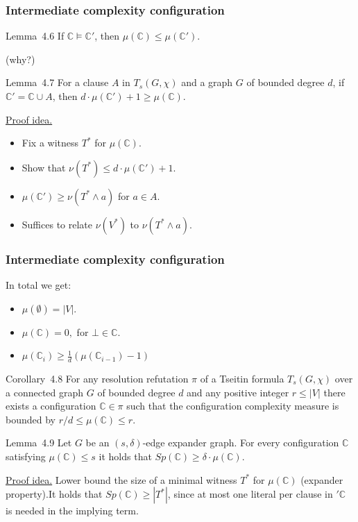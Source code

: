 \documentclass[t,usenames,dvipsnames]{beamer}
\begin{document}
\begin{frame}\frametitle{Intermediate complexity configuration}
	\begin{block} {Lemma~4.6}
		If $\mathbb{C} \models \mathbb{C}'$, then $\mu(\mathbb{C}) \leq \mu(\mathbb{C}')$.
	\end{block}
	(why?)\pause
	\begin{block} {Lemma~4.7}
		For a clause $A$ in $T_s(G, \chi)$ and a graph $G$ of bounded degree $d$, if
		$\mathbb{C'} = \mathbb{C} \cup A$, then $d \cdot \mu(\mathbb{C}') + 1 \geq
		\mu(\mathbb{C})$.
	\end{block}\pause
	\noindent \underline{Proof idea.} 
	\begin{itemize}
		\item Fix a witness $T^*$ for $\mu(\mathbb{C})$.
		\item Show that $\nu(T^*) \leq d\cdot \mu(\mathbb{C}') + 1$. 
		\item $\mu(\mathbb{C}') \geq \nu(T^* \land a)$ for $a \in A$.
		\item Suffices to relate $\nu(V^*)$ to $\nu(T^* \land a)$.
	\end{itemize}
\end{frame}\frametitle{Intermediate complexity configuration}

\begin{frame}
	In total we get:
	\begin{itemize}[<+->]
		\item $\mu(\emptyset) = |V|$.
		\item $\mu(\mathbb{C}) = 0,$ for $\bot \in \mathbb{C}$.
		\item $\mu(\mathbb{C}_i) \geq  \frac{1}{d} (\mu(\mathbb{C}_{i-1}) - 1)$
	\end{itemize}
	\pause
	\begin{block}{Corollary~4.8}
		For any resolution refutation $\pi$ of a Tseitin formula $T_s(G, \chi)$ over a
		connected graph $G$ of bounded degree $d$ and any positive integer $r \leq |V|$
		there exists a configuration $\mathbb{C} \in \pi$ such that the configuration
		complexity measure is bounded by $r/d \leq \mu(\mathbb{C}) \leq r$.
	\end{block}\pause
	\begin{block}{Lemma~4.9}
		Let $G$ be an $(s, \delta)$-edge expander graph. For every configuration
		$\mathbb{C}$ satisfying $\mu(\mathbb{C}) \leq s$ it holds that $Sp(\mathbb{C}) \geq
		\delta \cdot \mu(\mathbb{C})$.
	\end{block}\pause
	\noindent \underline{Proof idea.} Lower bound the size of a minimal witness $T^*$ for
	$\mu(\mathbb{C})$ (expander property).\pause It holds that $Sp(\mathbb{C}) \geq |T^*|$, since at
	most one literal per clause in $'\mathbb{C}$ is needed in the implying term.
\end{frame}
\end{document}
